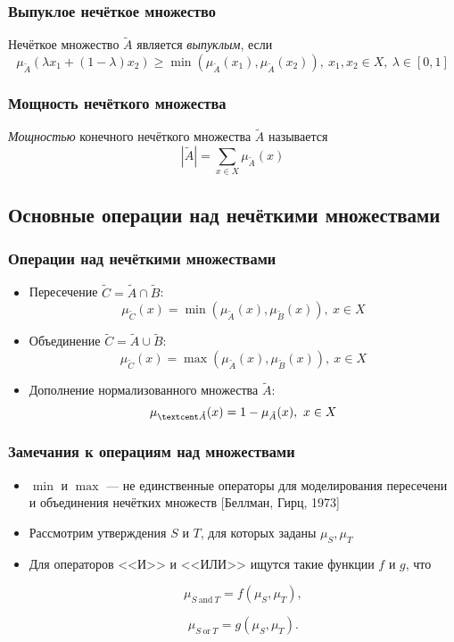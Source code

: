 \documentclass{beamer}
\begin{document}
\begin{frame}\frametitle{Выпуклое нечёткое множество}
    \begin{definition}
        Нечёткое множество $\tilde A$ является \textit{выпуклым}, если
        $$ \mu_{\tilde A}(\lambda x_1 + (1-\lambda) x_2) \geq \min{(\mu_{\tilde A}(x_1), \mu_{\tilde A}(x_2))},\ x_1,x_2 \in X,\ \lambda \in [0, 1] $$
    \end{definition}
\end{frame}

\begin{frame}\frametitle{Мощность нечёткого множества}
\begin{definition}
        \textit{Мощностью} конечного нечёткого множества $\tilde A$ называется $$ |\tilde A| = \sum_{x \in X}{\mu_{\tilde A}(x)} $$
    \end{definition}
\end{frame}

\subsection{Основные операции над нечёткими множествами}

\begin{frame}\frametitle{Операции над нечёткими множествами}
    \begin{itemize}
        \item Пересечение $\tilde C = \tilde A \cap \tilde B$: $$ \mu_{\tilde C}(x) = \min{(\mu_{\tilde A}(x), \mu_{\tilde B}(x))},\ x \in X$$
        \item Объединение $\tilde C = \tilde A \cup \tilde B$: $$ \mu_{\tilde C}(x) = \max{(\mu_{\tilde A}(x), \mu_{\tilde B}(x))},\ x \in X$$
        \item Дополнение нормализованного множества $\tilde A$: $$ \mu_{\textcent \tilde A}(x) = 1 - \mu_{\tilde A}(x),\ x \in X$$
    \end{itemize}
\end{frame}

\begin{frame}\frametitle{Замечания к операциям над множествами}
\begin{itemize}
    \item $\min$ и $\max$ --- не единственные операторы для моделирования пересечени и объединения нечётких множеств [Беллман, Гирц, 1973]
    \item Рассмотрим утверждения $S$ и $T$, для которых заданы $\mu_S, \mu_T$
    \item Для операторов <<И>> и <<ИЛИ>> ищутся такие функции $f$ и $g$, что
    
            $$ \mu_{S\ \mathrm{and}\ T} = f(\mu_S, \mu_T),$$
    
            $$ \mu_{S\ \mathrm{or}\ T} = g(\mu_S, \mu_T).$$
\end{itemize}
\end{frame}
\end{document}
